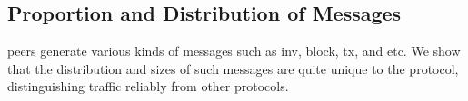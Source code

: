 \subsection{Proportion and Distribution of Messages} \label{sec:prop_dist_msg}
\bc peers generate various kinds of messages such as inv, block, tx, and etc. 
We show that the distribution and sizes of such messages are quite unique to the \bc protocol, 
distinguishing \bc traffic reliably from other protocols. 

